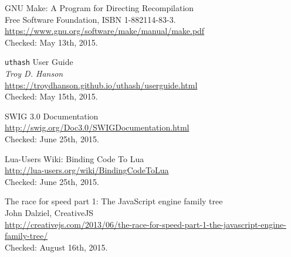 \begin{thebibliography}{99}
		GNU Make: A Program for Directing Recompilation \\
		Free Software Foundation, ISBN 1-882114-83-3. \\
		\url{https://www.gnu.org/software/make/manual/make.pdf} \\
		Checked: May 13th, 2015.

		\verb|uthash| User Guide \\
		\emph{Troy D. Hanson} \\
		\url{https://troydhanson.github.io/uthash/userguide.html} \\
		Checked: May 15th, 2015.

		SWIG 3.0 Documentation \\
		\url{http://swig.org/Doc3.0/SWIGDocumentation.html} \\
		Checked: June 25th, 2015.

		Lua-Users Wiki: Binding Code To Lua \\
		\url{http://lua-users.org/wiki/BindingCodeToLua} \\
		Checked: June 25th, 2015.

		The race for speed part 1: The JavaScript engine family tree \\
		John Dalziel, CreativeJS \\
		\url{http://creativejs.com/2013/06/the-race-for-speed-part-1-the-javascript-engine-family-tree/} \\
		Checked: August 16th, 2015.

\end{thebibliography}

